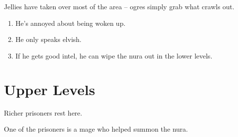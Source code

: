 \begin{multicols}{2}


Jellies have taken over most of the area -- ogres simply grab what crawls out.

\jelly

\jelly


\dragon

\begin{enumerate}

	\item{He's annoyed about being woken up.}
	\item{He only speaks elvish.}
	\item{If he gets good intel, he can wipe the nura out in the lower levels.}

\end{enumerate}


\end{multicols}

\section{Upper Levels}

\begin{multicols}{2}


Richer prisoners rest here.

One of the prisoners is a mage who helped summon the nura.

\humandiplomat


\umberhulk

\end{multicols}

